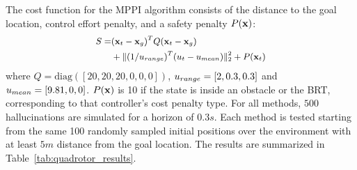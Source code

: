 The cost function for the MPPI algorithm consists of the distance to the goal location, control effort penalty, and a safety penalty $P(\mathbf{x})$:
%
\begin{equation}
\small %
    \begin{aligned}\label{eq:cost_mppi_quadrotor}
    S = & (\state_t - \state_g)^T Q(\state_t - \state_g) \\
    &+ \| (1/\ctrl_{range})^T (\ctrl_t - \ctrl_{mean})\|_2^2 + P(\state_t)
    \end{aligned}
\end{equation}
%
where
$Q = \text{diag}([20, 20, 20, 0, 0, 0])$,
$u_{range} = [2, 0.3, 0.3]$ and $u_{mean} = [9.81, 0, 0]$. 
$P(\mathbf{x})$ is 10 if the state is inside an obstacle or the BRT, corresponding to that controller’s cost penalty type. For all methods, $500$ hallucinations are simulated for a horizon of $0.3s$. Each method is tested starting from the same 100 randomly sampled initial positions over the environment with at least $5m$ distance from the goal location. The results are summarized in Table~\ref{tab:quadrotor_results}.
%

